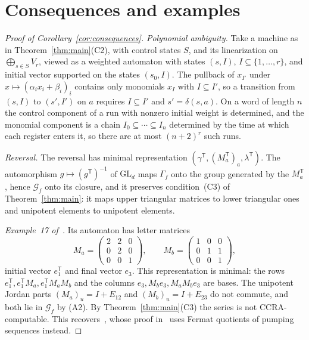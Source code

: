 \documentclass[11pt,letterpaper]{article}
\newcommand{\cG}{\mathcal{G}}
\newcommand{\GL}{\mathrm{GL}}
\theoremstyle{definition}
\begin{document}
\section{Consequences and examples}\label{sec:consequences}
\begin{proof}[Proof of Corollary~\ref{cor:consequences}]
\emph{Polynomial ambiguity.} Take a machine as in Theorem~\ref{thm:main}(C2), with control states $S$, and its linearization on $\bigoplus_{s\in S}V_r$, viewed as a weighted automaton with states $(s,I)$, $I\subseteq\{1,\ldots,r\}$, and initial vector supported on the states $(s_0,I)$. The pullback of $x_{I'}$ under $x\mapsto(\alpha_ix_i+\beta_i)_i$ contains only monomials $x_I$ with $I\subseteq I'$, so a transition from $(s,I)$ to $(s',I')$ on $a$ requires $I\subseteq I'$ and $s'=\delta(s,a)$. On a word of length $n$ the control component of a run with nonzero initial weight is determined, and the monomial component is a chain $I_0\subseteq\cdots\subseteq I_n$ determined by the time at which each register enters it, so there are at most $(n+2)^r$ such runs.

\emph{Reversal.} The reversal has minimal representation $(\gamma^{\mathsf T},(M_a^{\mathsf T})_a,\lambda^{\mathsf T})$. The automorphism $g\mapsto(g^{\mathsf T})^{-1}$ of $\GL_d$ maps $\Gamma_f$ onto the group generated by the $M_a^{\mathsf T}$, hence $\cG_f$ onto its closure, and it preserves condition~(C3) of Theorem~\ref{thm:main}: it maps upper triangular matrices to lower triangular ones and unipotent elements to unipotent elements.

\emph{Example~17 of~\cite{MPS26}.} Its automaton has letter matrices
\[
M_a=\begin{pmatrix}2&2&0\\0&2&0\\0&0&1\end{pmatrix},\qquad
M_b=\begin{pmatrix}1&0&0\\0&1&1\\0&0&1\end{pmatrix},
\]
initial vector $e_1^{\mathsf T}$ and final vector $e_3$. This representation is minimal: the rows $e_1^{\mathsf T},e_1^{\mathsf T}M_a,e_1^{\mathsf T}M_aM_b$ and the columns $e_3,M_be_3,M_aM_be_3$ are bases. The unipotent Jordan parts $(M_a)_u=I+E_{12}$ and $(M_b)_u=I+E_{23}$ do not commute, and both lie in $\cG_f$ by (A2). By Theorem~\ref{thm:main}(C3) the series is not CCRA-computable. This recovers~\cite[Theorem~18]{MPS26}, whose proof in~\cite[Example~17]{MPS26} uses Fermat quotients of pumping sequences instead.
\end{proof}
\end{document}
